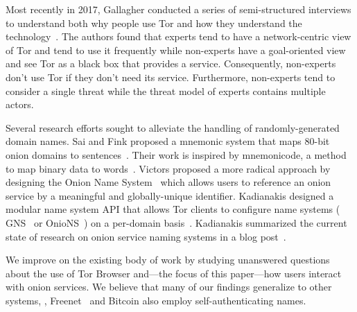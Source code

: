 Most recently in 2017, Gallagher \ea conducted a series of semi-structured
interviews to understand both why people use Tor and how they understand the
technology~\cite{Gallagher2017a}.  The authors found that experts tend to have a
network-centric view of Tor and tend to use it frequently while non-experts have
a goal-oriented view and see Tor as a black box that provides a service.
Consequently, non-experts don't use Tor if they don't need its service.
Furthermore, non-experts tend to consider a single threat while the threat model
of experts contains multiple actors.

Several research efforts sought to alleviate the handling of randomly-generated
domain names.  Sai and Fink proposed a mnemonic system that maps 80-bit onion
domains to sentences~\cite{Sai2012a}.  Their work is inspired by mnemonicode, a
method to map binary data to words~\cite{mnemonicode}.  Victors \ea proposed a
more radical approach by designing the Onion Name System~\cite{Victors2017a}
which allows users to reference an onion service by a meaningful and
globally-unique identifier.  Kadianakis \ea designed a modular name system API
that allows Tor clients to configure name systems (\eg
GNS~\cite{Schanzenbach2012a} or OnioNS~\cite{Victors2017a}) on a per-domain
basis~\cite{Kadianakis2016a}.  Kadianakis summarized the current state of
research on onion service naming systems in a blog post~\cite{Kadianakis2017a}.

We improve on the existing body of work by studying unanswered questions about
the use of Tor Browser and---the focus of this paper---how users interact with
onion services.  We believe that many of our findings generalize to other
systems, \eg, Freenet~\cite{Freenet} and Bitcoin also employ self-authenticating
names.
